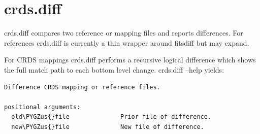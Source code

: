 \documentclass[letterpaper,10pt,english]{sphinxmanual}
\def\PYGZus{\char`\_}
\begin{document}
\section{crds.diff}
\label{command_line_tools:crds-diff}
crds.diff compares two reference or mapping files and reports differences.  For
references crds.diff is currently a thin wrapper around fitsdiff but may expand.

For CRDS mappings crds.diff performs a recursive logical difference which shows
the full match path to each bottom level change.   crds.diff --help yields:

\begin{Verbatim}[commandchars=\\\{\}]
Difference CRDS mapping or reference files.

positional arguments:
  old\PYGZus{}file              Prior file of difference.
  new\PYGZus{}file              New file of difference.


\end{Verbatim}
\end{document}
